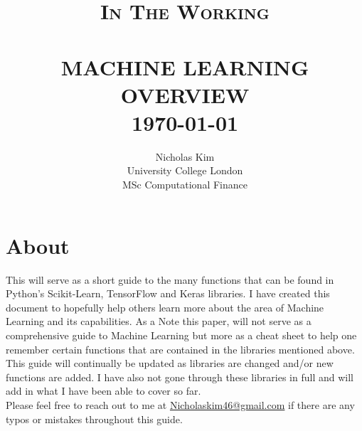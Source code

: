 \documentclass[11pt]{article}
\title{	\normalsize \textsc{In The Working} 	%
		 	\\[2.0cm]								%
			\HRule{1pt} \\						%
			\LARGE \textbf{\uppercase{Machine Learning Overview}}	%
			\HRule{2pt} \\ [0.5cm]		%
			\normalsize \today			%
		}
\author{
		Nicholas Kim\\	
		University College London\\	
		MSc Computational Finance \\ 
}
\makeatletter
\def\printtitle{%
    {\centering \@title\par}}
\def\printauthor{%
    {\centering \large \@author}}
\makeatother
\begin{document}
\thispagestyle{empty}

\printtitle
        \vfill
\printauthor
\newpage

\setcounter{page}{1}
\section*{About}

This will serve as a short guide to the many functions that can be found in Python's
Scikit-Learn, TensorFlow and Keras libraries. I have created this document to hopefully 
help others learn more about the area of Machine Learning and its capabilities. As a Note
this paper, will not serve as a comprehensive guide to Machine Learning but more as a 
cheat sheet to help one remember certain functions that are contained in the libraries 
mentioned above. \\

\noindent 
This guide will continually be updated as libraries are changed and/or new 
functions are added. I have also not gone through these libraries in full and will add 
in what I have been able to cover so far. \\ 

\noindent 
Please feel free to reach out to me at 
\href{mailto:Nicholaskim46@gmail.com}{Nicholaskim46@gmail.com} if there are any typos or
mistakes throughout this guide.

\pagebreak

\tableofcontents

\pagebreak












\end{document}
